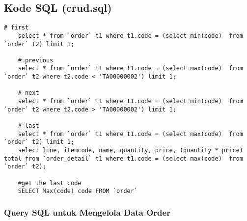\subsection{Kode SQL (crud.sql)}

\begin{lstlisting}[style=JavaStyle]
	# first
	select * from `order` t1 where t1.code = (select min(code)  from `order` t2) limit 1;
	
	# previous
	select * from `order` t1 where t1.code = (select max(code)  from `order` t2 where t2.code < 'TA00000002') limit 1;
	
	# next
	select * from `order` t1 where t1.code = (select min(code)  from `order` t2 where t2.code > 'TA00000002') limit 1;
	
	# last
	select * from `order` t1 where t1.code = (select max(code)  from `order` t2) limit 1;
	select line, itemcode, name, quantity, price, (quantity * price) total from `order_detail` t1 where t1.code = (select max(code)  from `order` t2);
	
	#get the last code
	SELECT Max(code) code FROM `order`
\end{lstlisting}

\subsubsection{Query SQL untuk Mengelola Data Order}

